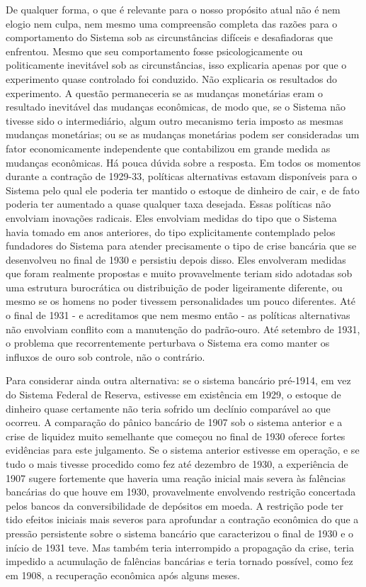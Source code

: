 \documentclass[12pt]{article}
\begin{document}
De qualquer forma, o que é relevante para o nosso propósito atual não é nem elogio nem culpa, nem mesmo uma compreensão completa das razões para o comportamento do Sistema sob as circunstâncias difíceis e desafiadoras que enfrentou. Mesmo que seu comportamento fosse psicologicamente ou politicamente inevitável sob as circunstâncias, isso explicaria apenas por que o experimento quase controlado foi conduzido. Não explicaria os resultados do experimento. A questão permaneceria se as mudanças monetárias eram o resultado inevitável das mudanças econômicas, de modo que, se o Sistema não tivesse sido o intermediário, algum outro mecanismo teria imposto as mesmas mudanças monetárias; ou se as mudanças monetárias podem ser consideradas um fator economicamente independente que contabilizou em grande medida as mudanças econômicas. Há pouca dúvida sobre a resposta. Em todos os momentos durante a contração de 1929-33, políticas alternativas estavam disponíveis para o Sistema pelo qual ele poderia ter mantido o estoque de dinheiro de cair, e de fato poderia ter aumentado a quase qualquer taxa desejada. Essas políticas não envolviam inovações radicais. Eles envolviam medidas do tipo que o Sistema havia tomado em anos anteriores, do tipo explicitamente contemplado pelos fundadores do Sistema para atender precisamente o tipo de crise bancária que se desenvolveu no final de 1930 e persistiu depois disso. Eles envolveram medidas que foram realmente propostas e muito provavelmente teriam sido adotadas sob uma estrutura burocrática ou distribuição de poder ligeiramente diferente, ou mesmo se os homens no poder tivessem personalidades um pouco diferentes. Até o final de 1931 - e acreditamos que nem mesmo então - as políticas alternativas não envolviam conflito com a manutenção do padrão-ouro. Até setembro de 1931, o problema que recorrentemente perturbava o Sistema era como manter os influxos de ouro sob controle, não o contrário.

Para considerar ainda outra alternativa: se o sistema bancário pré-1914, em vez do Sistema Federal de Reserva, estivesse em existência em 1929, o estoque de dinheiro quase certamente não teria sofrido um declínio comparável ao que ocorreu. A comparação do pânico bancário de 1907 sob o sistema anterior e a crise de liquidez muito semelhante que começou no final de 1930 oferece fortes evidências para este julgamento. Se o sistema anterior estivesse em operação, e se tudo o mais tivesse procedido como fez até dezembro de 1930, a experiência de 1907 sugere fortemente que haveria uma reação inicial mais severa às falências bancárias do que houve em 1930, provavelmente envolvendo restrição concertada pelos bancos da conversibilidade de depósitos em moeda. A restrição pode ter tido efeitos iniciais mais severos para aprofundar a contração econômica do que a pressão persistente sobre o sistema bancário que caracterizou o final de 1930 e o início de 1931 teve. Mas também teria interrompido a propagação da crise, teria impedido a acumulação de falências bancárias e teria tornado possível, como fez em 1908, a recuperação econômica após alguns meses.
\end{document}
